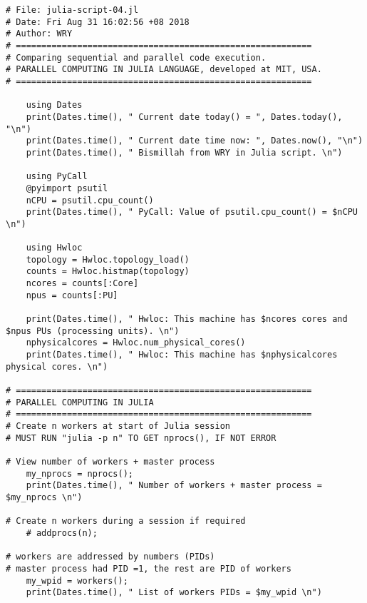 
\begin{lstlisting}[caption={App4-Julia Parallel Programming Codes}, label=App4-Julia Parallel Programming Codes]
# File: julia-script-04.jl
# Date: Fri Aug 31 16:02:56 +08 2018
# Author: WRY
# ==========================================================
# Comparing sequential and parallel code execution.
# PARALLEL COMPUTING IN JULIA LANGUAGE, developed at MIT, USA.
# ==========================================================

	using Dates 
	print(Dates.time(), " Current date today() = ", Dates.today(), "\n")
	print(Dates.time(), " Current date time now: ", Dates.now(), "\n")
	print(Dates.time(), " Bismillah from WRY in Julia script. \n") 
	
	using PyCall
	@pyimport psutil
	nCPU = psutil.cpu_count()
	print(Dates.time(), " PyCall: Value of psutil.cpu_count() = $nCPU \n")

	using Hwloc
	topology = Hwloc.topology_load()
	counts = Hwloc.histmap(topology)
	ncores = counts[:Core]
	npus = counts[:PU]
	
	print(Dates.time(), " Hwloc: This machine has $ncores cores and $npus PUs (processing units). \n")
	nphysicalcores = Hwloc.num_physical_cores()
	print(Dates.time(), " Hwloc: This machine has $nphysicalcores physical cores. \n")

# ==========================================================
# PARALLEL COMPUTING IN JULIA
# ==========================================================
# Create n workers at start of Julia session
# MUST RUN "julia -p n" TO GET nprocs(), IF NOT ERROR

# View number of workers + master process
	my_nprocs = nprocs();
	print(Dates.time(), " Number of workers + master process = $my_nprocs \n")

# Create n workers during a session if required
	# addprocs(n);

# workers are addressed by numbers (PIDs)
# master process had PID =1, the rest are PID of workers
	my_wpid = workers();
	print(Dates.time(), " List of workers PIDs = $my_wpid \n")


\end{lstlisting}
